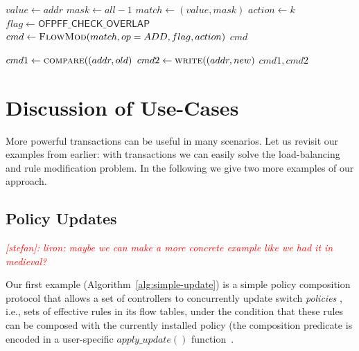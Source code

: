 \documentclass[conference]{sigcomm-alternate}
\newcommand{\concat}[0]{\oplus}
\newcommand{\cas}{CAS\xspace}
\newcommand{\compare}{compare\xspace}
\newcommand{\memwrite}{write\xspace}
\newcommand{\stefan}[1]{\textit{\textcolor{red}{[stefan]: #1}}} %
\begin{document}
\begin{algorithm}[h]
    \caption{$\textit{\compare}(addr,k)$}
    \label{alg:compare}
    \begin{algorithmic}[1]
    		\State $value \gets addr$
    		\State $mask \gets  all-1$
    		\State $match \gets (value,mask)$
    		\State $action \gets k$
    		\State $flag \gets \textsf{OFPFF\_CHECK\_OVERLAP}$
    		\State $cmd\gets \textsc{FlowMod}(match, op = ADD, flag, action) $
			\Return $cmd$
    \end{algorithmic}
\end{algorithm}



\begin{algorithm}[h]
    \caption{$\textit{\cas}(addr, old,new)$}
    \label{alg:cas}
    \begin{algorithmic}[1]

    		\State $cmd1\gets \textsc{\compare}((addr, old) $
    		\State $cmd2\gets \textsc{\memwrite}((addr, new) $
			\Return $cmd1,cmd2$
    \end{algorithmic}
\end{algorithm}



\section{Discussion of Use-Cases}\label{sec:apps}

More powerful transactions can be useful in many scenarios.
Let us revisit our examples from earlier: with
transactions we can easily solve the load-balancing
and rule modification problem.
In the following we give two more examples of our approach.

\subsection{Policy Updates}

\stefan{liron: maybe we can make a more concrete example like we had it in medieval?}

Our first example (Algorithm~\ref{alg:simple-update}) is a simple policy composition protocol that
allows a set of  controllers to concurrently update switch  \emph{policies} , i.e., sets of
effective rules in its flow tables, under the
condition that these rules can be composed with the currently installed
policy (the composition predicate is encoded in a user-specific
$\textit{apply\_update}()$ function~\cite{cpc}.
\end{document}
